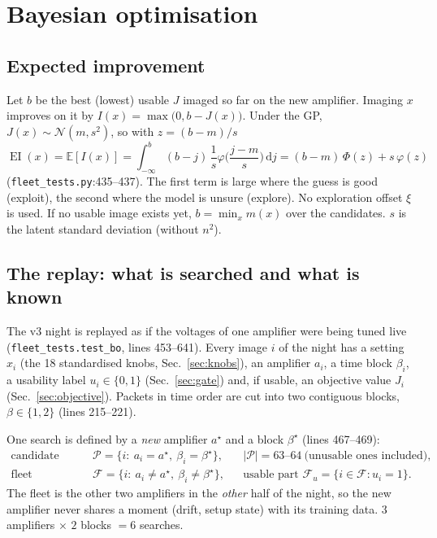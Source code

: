 \documentclass[10pt,a4paper]{article}
\newcommand{\code}[1]{\texttt{\small #1}}
\newcommand{\dd}{\,\mathrm{d}}
\newcommand{\EI}{\operatorname{EI}}
\begin{document}
\section{Bayesian optimisation}\label{sec:bo}

\subsection{Expected improvement}
Let $b$ be the best (lowest) usable $J$ imaged so far on the new amplifier. Imaging $x$ improves on it by
$I(x)=\max\big(0,b-J(x)\big)$. Under the GP, $J(x)\sim\mathcal N(m,s^2)$, so with $z=(b-m)/s$
\begin{equation}
\EI(x)=\mathbb E[I(x)]=\int_{-\infty}^{b}(b-j)\,\frac1s\varphi\!\Big(\frac{j-m}{s}\Big)\dd j
=(b-m)\,\Phi(z)+s\,\varphi(z)
\label{eq:ei}
\end{equation}
\cite{jones1998} (\code{fleet\_tests.py}:435--437). The first term is large where the guess is good (exploit), the second
where the model is unsure (explore). No exploration offset $\xi$ is used. If no usable image exists yet, $b=\min_x m(x)$ over
the candidates. $s$ is the latent standard deviation (without $n^2$).

\subsection{The replay: what is searched and what is known}\label{sec:replay}
The v3 night is replayed as if the voltages of one amplifier were being tuned live (\code{fleet\_tests.test\_bo}, lines 453--641).
Every image $i$ of the night has a setting $x_i$ (the 18 standardised knobs, Sec.~\ref{sec:knobs}), an amplifier $a_i$, a time
block $\beta_i$, a usability label $u_i\in\{0,1\}$ (Sec.~\ref{sec:gate}) and, if usable, an objective value $J_i$
(Sec.~\ref{sec:objective}). Packets in time order are cut into two contiguous blocks, $\beta\in\{1,2\}$ (lines 215--221).

One search is defined by a \emph{new} amplifier $a^\star$ and a block $\beta^\star$ (lines 467--469):
\begin{align}
\text{candidate pool}\quad &\mathcal P=\{i:\ a_i=a^\star,\ \beta_i=\beta^\star\}, && |\mathcal P|=63\text{--}64\ \text{(unusable ones included)},\\
\text{fleet}\quad &\mathcal F=\{i:\ a_i\ne a^\star,\ \beta_i\ne\beta^\star\}, && \text{usable part }\mathcal F_u=\{i\in\mathcal F:u_i=1\}.
\end{align}
The fleet is the other two amplifiers in the \emph{other} half of the night, so the new amplifier never shares a moment (drift,
setup state) with its training data. $3$ amplifiers $\times$ $2$ blocks $=6$ searches.
\end{document}
